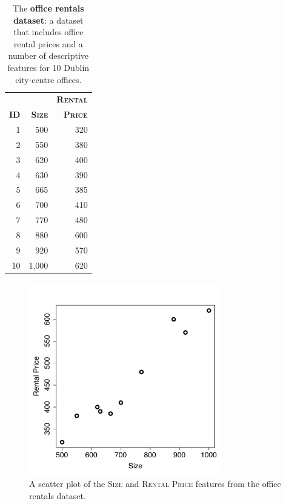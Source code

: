 \documentclass[xcolor={table}]{beamer}
\newcommand{\featN}[1]{\textsc{#1}}
\begin{document}
 \begin{frame} 
\begin{table}
	\caption{The \textbf{office rentals dataset}: a dataset that includes office rental prices and a number of descriptive features for 10 Dublin city-centre offices.}
	\centering
	\begin{footnotesize}
	\begin{tabular}{r r r }
		\hline
				\textbf{}	 & \textbf{}	& \textbf{\featN{Rental}} \\
		\textbf{\featN{ID}}	 & \textbf{\featN{Size}}	 &  \textbf{\featN{Price}} \\
		\hline
1 & 500	&		320	\\
2 & 550	&		380	\\
3 & 620	&		400	\\
4 & 630	&		390	\\
5 & 665	&		385	\\
6 & 700	&		410	\\
7 & 770	&	480	\\
8 & 880	&	600	\\
9 & 920	&	570	\\
10 & 1,000	&	620	\\
		\hline
	\end{tabular}
	\end{footnotesize}
\label{tab:officeSizesAndPrices}
\end{table}
\end{frame} 

 \begin{frame} [plain]
\begin{figure}[!htb]
\begin{center}
\includegraphics[width=0.75\textwidth]{./images/linearRegressionDemoDataset.pdf}
\end{center}
\caption{A scatter plot of the \featN{Size} and \featN{Rental Price} features from the office rentals dataset.}
\label{fig:officeSizesAndPrices}
\end{figure}
\end{frame} 
\end{document}
